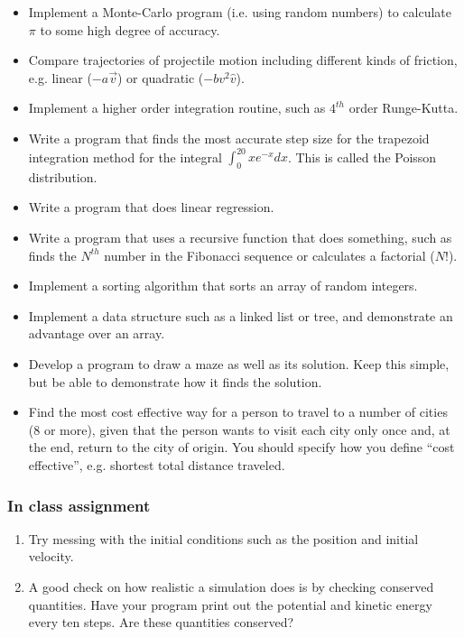 \documentclass{beamer}
\begin{document}
\begin{frame}[allowframebreaks]
\begin{itemize}
  \item Implement a Monte-Carlo program (i.e. using random numbers) to
    calculate $\pi$ to some high degree of accuracy.
  \item Compare trajectories of projectile motion including different
    kinds of friction, e.g. linear ($-a\vec{v}$) or quadratic ($-bv^2\hat{v}$).
  \item Implement a higher order integration routine, such as $4^{th}$ order 
    Runge-Kutta.
  \item Write a program that finds the most accurate step size for
    the trapezoid integration method for the integral 
    $\int_0^{20}xe^{-x}dx$. 
    This is called the Poisson distribution.
  \item Write a program that does linear regression.
  \item Write a program that uses a recursive function that does something,
    such as finds the $N^{th}$ number in the Fibonacci sequence or calculates
    a factorial ($N!$).
  \item Implement a sorting algorithm that sorts an array of random
    integers.
  \item Implement a data structure such as a linked list or tree, and 
    demonstrate an advantage over an array.
  \item Develop a program to draw a maze as well as its solution. Keep this
    simple, but be able to demonstrate how it finds the solution.
  \item Find the most cost effective way for a person to travel to a number
    of cities (8 or more), given that the person wants to visit each city
    only once and, at the end, return to the city of origin. You should
    specify how you define ``cost effective'', e.g. shortest total distance
    traveled.
  \end{itemize}
\end{frame}

\begin{frame}
  \frametitle{In class assignment}
  \begin{enumerate}
    \item Try messing with the initial conditions such as the position and
      initial velocity.
    \item A good check on how realistic a simulation does 
      is by checking conserved
      quantities. Have your program print out the potential and kinetic energy
      every ten steps. Are these quantities conserved?
  \end{enumerate}
\end{frame}
\end{document}
